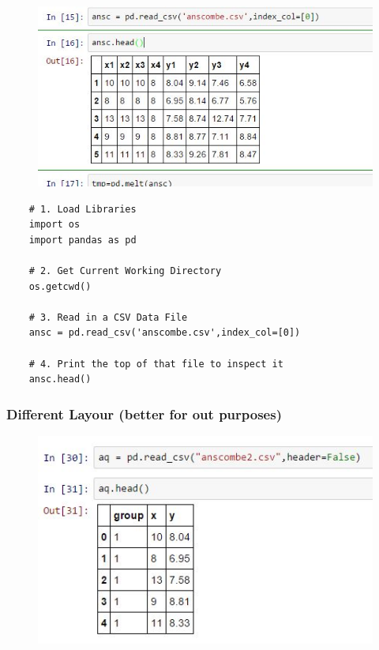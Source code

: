 \documentclass{beamer}
\begin{document}
\begin{frame}
	\begin{figure}
		\centering
		\includegraphics[width=1.1\linewidth]{anscombe2}
		
	\end{figure}
	
\end{frame}
\begin{frame}[fragile]
	\large
	\begin{framed}
	\begin{verbatim}
	# 1. Load Libraries
	import os
	import pandas as pd
	
	# 2. Get Current Working Directory
	os.getcwd()
	
	# 3. Read in a CSV Data File
	ansc = pd.read_csv('anscombe.csv',index_col=[0])
	
	# 4. Print the top of that file to inspect it
	ansc.head()
	\end{verbatim}
	\end{framed}
\end{frame}
\begin{frame}[fragile]
	\frametitle{Different Layour (better for out purposes)}
\begin{figure}
\centering
\includegraphics[width=1.1\linewidth]{anscombe3}
\end{figure}

\end{frame}
\end{document}
